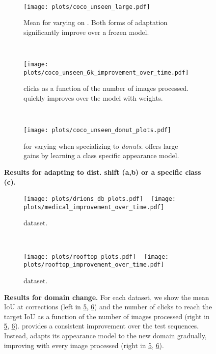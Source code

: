 \begin{figure}[t]
    \centering
    ~
   \begin{subfigure}[t]{0.3\textwidth}
    \texttt{[image: plots/coco\_unseen\_large.pdf]}
    \caption{Mean \iouAtK{} for varying  on \cocounseenlarge{}.
    Both forms of adaptation significantly improve over a frozen model.
    }
    \label{fig:coco_unseen_6k_iou_at_k}
    \end{subfigure}
    ~
    \begin{subfigure}[t]{0.3\textwidth}
    \texttt{[image: plots/coco\_unseen\_6k\_improvement\_over\_time.pdf]}
    \caption{ clicks as a function of the number of images processed.
    \sequenceadaptationshort{} quickly improves over the model with \fixedmodel{} weights.
    }
    \label{fig:coco_unseen_6k_over_time}
    \end{subfigure}
    ~    
    \begin{subfigure}[t]{0.3\textwidth}
    \texttt{[image: plots/coco\_unseen\_donut\_plots.pdf]}
    \caption{
    \iouAtK{} for varying  when specializing to \textit{donuts}.	
    \sequenceadaptationshort{} offers large gains
    by learning a class specific appearance model.
    }
    \label{fig:coco_unseen_donut_clicks_plot}
    \end{subfigure}
    \caption{\textbf{Results for adapting to dist. shift (a,b) or a specific class (c).}
    } 
    \label{fig:curve_collection_distribution}
\end{figure}
\begin{figure}[t!]   
    \begin{subfigure}[t]{0.50\textwidth}
    \texttt{[image: plots/drions\_db\_plots.pdf]}
    ~
    \texttt{[image: plots/medical\_improvement\_over\_time.pdf]}
    \caption{\medical{} dataset.
    }
    \label{fig:drions_sequence_adaptation}
    \end{subfigure}
    ~
    \begin{subfigure}[t]{0.50\textwidth}
    \texttt{[image: plots/rooftop\_plots.pdf]}
    ~
    \texttt{[image: plots/rooftop\_improvement\_over\_time.pdf]}
    \caption{\rooftop{} dataset.
    }
    \label{fig:rooftop_improvement_smoothed}
    \end{subfigure}
    \caption{\textbf{Results for domain change.}
    For each dataset, we show the mean IoU at  corrections (left in \ref{fig:drions_sequence_adaptation}, \ref{fig:rooftop_improvement_smoothed}) and the number of clicks to reach the target IoU as a function of the number of images processed (right in \ref{fig:drions_sequence_adaptation}, \ref{fig:rooftop_improvement_smoothed}).
    \uc \imageSGD{} provides a consistent improvement over the test sequences.
    Instead, \datasetSGD{} adapts its appearance model to the new domain gradually, improving with every image processed (right in \ref{fig:drions_sequence_adaptation}, \ref{fig:rooftop_improvement_smoothed}).
    }
    \label{fig:domain_adapt}

\end{figure}
